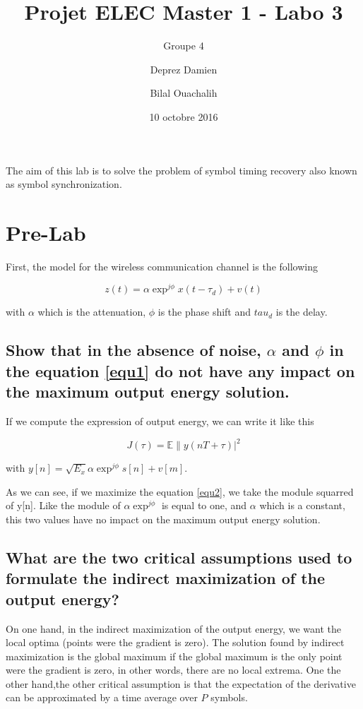 \documentclass[frenchb, oneside, headings=normal]{scrartcl}
\begin{document}
\title{Projet ELEC Master 1 - Labo 3}
\subtitle{Groupe 4}
\author{Deprez Damien \and Bilal Ouachalih }
\date{10 octobre 2016}
\maketitle

The aim of this lab is to solve the problem of symbol timing recovery also known as symbol synchronization.

\section{Pre-Lab}

First, the model for the wireless communication channel is the following

\begin{equation}
z(t)=\alpha\exp^{j\phi} x(t-\tau_{d})+v(t)
\label{equ1}
\end{equation}

with $\alpha$ which is the attenuation, $\phi$ is the phase shift and $tau_d$ is the delay.

\subsection{Show that in the absence of noise, $\alpha$ and $\phi$ in the equation \ref{equ1} do not have any impact on the maximum output energy solution.} 

If we compute the expression of output energy, we can write it like this

\begin{equation}
J(\tau)=\mathbb{E}\|y(nT+\tau)|^2
\label{equ2}
\end{equation}

with $y[n]=\sqrt{E_x}\alpha\exp^{j\phi}s[n]+v[m]$.

As we can see, if we maximize the equation \ref{equ2}, we take the module squarred of y[n]. Like the module of $\alpha\exp^{j\phi}$ is equal to one, and $\alpha$ which is a constant, this two values have no impact on the maximum output energy solution.

\subsection{What are the two critical assumptions used to formulate the indirect maximization of the output energy?}

On one hand, in the indirect maximization of the output energy, we want the local optima (points were the gradient is zero). The solution found by indirect maximization is the global maximum if the global maximum is the only point were the gradient is zero, in other words, there are no local extrema.
    One the other hand,the other critical assumption is that the expectation of the derivative can be approximated by a time average over $P$ symbols.
\end{document}

